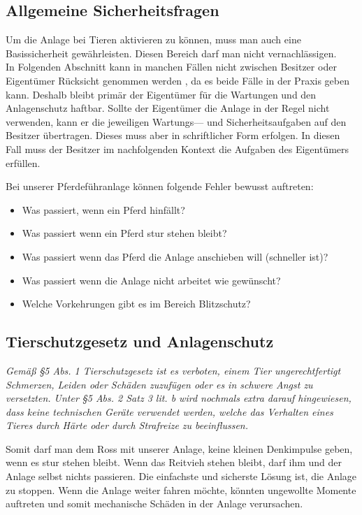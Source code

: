 \subsection{Allgemeine Sicherheitsfragen}
\label{sec:allgemeineSicherheitsfragen}

Um die Anlage bei Tieren aktivieren zu können, muss man auch eine Basissicherheit gewährleisten.
Diesen Bereich darf man nicht vernachlässigen. \\ In Folgenden Abschnitt  kann in manchen Fällen nicht zwischen Besitzer oder Eigentümer Rücksicht genommen werden , da es beide Fälle in der Praxis geben kann. Deshalb bleibt primär der Eigentümer für die Wartungen und den Anlagenschutz haftbar. Sollte der Eigentümer die Anlage in der Regel nicht verwenden, kann er die jeweiligen Wartungs--- und Sicherheitsaufgaben auf den Besitzer übertragen. Dieses muss aber in schriftlicher Form erfolgen. In diesen Fall muss der Besitzer im nachfolgenden Kontext die Aufgaben des Eigentümers erfüllen.

Bei unserer Pferdeführanlage können folgende Fehler bewusst auftreten:

\begin{itemize}
\item{Was passiert, wenn ein Pferd hinfällt?}
\item{Was passiert wenn ein Pferd stur stehen bleibt?}
\item{Was passiert wenn das Pferd die Anlage anschieben will (schneller ist)?}
\item{Was passiert wenn die Anlage nicht arbeitet wie gewünscht?}
\item{Welche Vorkehrungen gibt es im Bereich Blitzschutz?}
\end{itemize}

\subsection{Tierschutzgesetz und Anlagenschutz}
\label{sec:tierschutzgesetzUndAnlagenschutz}

\emph{Gemäß §5 Abs. 1 Tierschutzgesetz ist es verboten, 
einem Tier ungerechtfertigt Schmerzen, Leiden oder Schäden zuzufügen oder es in schwere Angst zu versetzten. 
Unter §5 Abs. 2 Satz 3 lit. b wird nochmals extra darauf hingewiesen, dass keine technischen Geräte verwendet werden, welche das Verhalten eines Tieres durch Härte oder durch Strafreize zu beeinflussen.} 

Somit darf man dem Ross mit unserer Anlage, keine kleinen Denkimpulse geben, wenn es stur stehen bleibt. Wenn das Reitvieh stehen bleibt, darf ihm und der Anlage selbst nichts passieren. Die einfachste und sicherste Lösung ist, die Anlage zu stoppen. Wenn die Anlage weiter fahren möchte, könnten ungewollte Momente auftreten und somit mechanische Schäden in der Anlage verursachen.

